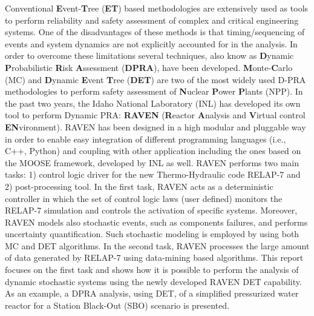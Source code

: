
Conventional \textbf{E}vent-\textbf{T}ree (\textbf{ET}) based methodologies are extensively used as tools to perform reliability and safety assessment of complex and critical engineering systems. 
One of the disadvantages of these methods is that timing/sequencing of events and system dynamics are not explicitly accounted for in the analysis.
In order to overcome these limitations several techniques, also know as \textbf{D}ynamic \textbf{P}robabilistic \textbf{R}isk \textbf{A}ssessment (\textbf{DPRA}), have been developed. \textbf{M}onte-\textbf{C}arlo (MC) and \textbf{D}ynamic \textbf{E}vent \textbf{T}ree (\textbf{DET}) are two of the most widely used D-PRA methodologies to perform safety assessment of \textbf{N}uclear \textbf{P}ower \textbf{P}lants (NPP).
In the past two years, the Idaho National Laboratory (INL) has developed its own tool to perform Dynamic PRA: \textbf{RAVEN} (\textbf{R}eactor \textbf{A}nalysis and \textbf{V}irtual control \textbf{EN}vironment).
RAVEN has been designed in a high modular and pluggable way in order to enable easy integration of different programming languages (i.e., C++, Python) and coupling with other application including the ones based on the MOOSE framework, developed by INL as well.
RAVEN performs two main tasks: 1) control logic driver for the new Thermo-Hydraulic code RELAP-7 and 2) post-processing tool.
In the first task, RAVEN acts as a deterministic controller in which the set of control logic laws (user defined) monitors the RELAP-7 simulation and controls the activation of specific systems.
Moreover, RAVEN models also stochastic events, such as components failures, and performs uncertainty quantification. Such stochastic modeling is employed by using both MC and DET algorithms.
In the second task, RAVEN processes the large amount of data generated by RELAP-7 using data-mining based algorithms.
This report focuses on the first task and shows how it is possible to perform the analysis of dynamic stochastic systems using the newly developed RAVEN DET capability.
As an example, a DPRA analysis, using DET, of a simplified pressurized water reactor for a Station Black-Out (SBO) scenario is presented.